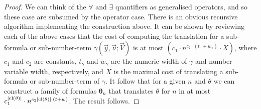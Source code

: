 \documentclass[../main/thesis.tex]{subfiles}
\begin{document}
\begin{proof}
  We can think of the $\forall$ and $\exists$ quantifiers as generalised
  operators, and so these case are subsumed by the operator case. There is an
  obvious recursive algorithm implementing the construction above. It can be
  shown by reviewing each of the above cases that the cost of computing the
  translation for a sub-formula or sub-number-term $\gamma (\vec{y}, \vec{\nu} ;
  \vec{V})$ is at most $(c_1 \cdot n^{c_2 \cdot (t_{\gamma} + w_{\gamma} )}
  \cdot X)$, where $c_1$ and $c_2$ are constants, $t_{\gamma}$ and $w_{\gamma}$
  are the numeric-width of $\gamma$ and number-variable width, respectively, and
  $X$ is the maximal cost of translating a sub-formula or sub-number-term of
  $\gamma$. It follow that for a given $n$ and $\theta$ we can construct a
  family of formulas $\boldsymbol{\theta}_n$ that translates $\theta$ for $n$ in
  at most $c^{\vert \mathrm{cl}(\theta) \vert}_1 \cdot n^{c_2 \vert \mathrm{cl}(\theta) \vert
    \cdot (t + w)}$. The result follows.
\end{proof}


  
\end{document}
